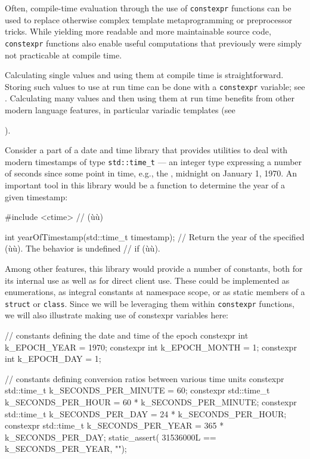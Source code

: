 Often, compile-time evaluation through the use of \lstinline!constexpr!
functions can be used to replace otherwise complex template
metaprogramming or preprocessor tricks. While yielding more readable and
more maintainable source code, \lstinline!constexpr! functions also enable
useful computations that previously were simply not practicable at
compile time.

Calculating single values and using them at compile time is
straightforward. Storing such values to use at run time can be done with
a \lstinline!constexpr! variable; see . Calculating many values and then using them at run time
benefits from other modern language features, in particular variadic
templates (see {).

Consider a part of a date and time library that provides utilities to
deal with modern timestamps of type \lstinline!std::time_t! --- an integer
type expressing a number of seconds since some point in time, e.g., the
, midnight on January 1, 1970. An important tool in
this library would be a function to determine the year of a given
timestamp:

\begin{emcppslisting}[emcppsbatch=e14]
#include <ctime>  // (ù{}ù)

int yearOfTimestamp(std::time_t timestamp);
    // Return the year of the specified (ù{}ù). The behavior is undefined
    // if (ù{}ù).
\end{emcppslisting}


\noindent Among other features, this library would provide a number of constants,
both for its internal use as well as for direct client use. These could
be implemented as enumerations, as integral constants at namespace
scope, or as static members of a \lstinline!struct! or \lstinline!class!.
Since we will be leveraging them within \lstinline!constexpr! functions, we
will also illustrate making use of constexpr variables here:

\begin{emcppslisting}[emcppsbatch=e14]
// constants defining the date and time of the epoch
constexpr int k_EPOCH_YEAR  = 1970;
constexpr int k_EPOCH_MONTH = 1;
constexpr int k_EPOCH_DAY   = 1;

// constants defining conversion ratios between various time units
constexpr std::time_t k_SECONDS_PER_MINUTE = 60;
constexpr std::time_t k_SECONDS_PER_HOUR   = 60  * k_SECONDS_PER_MINUTE;
constexpr std::time_t k_SECONDS_PER_DAY    = 24  * k_SECONDS_PER_HOUR;
constexpr std::time_t k_SECONDS_PER_YEAR   = 365 * k_SECONDS_PER_DAY;
static_assert( 31536000L == k_SECONDS_PER_YEAR, "");
\end{emcppslisting}


}
